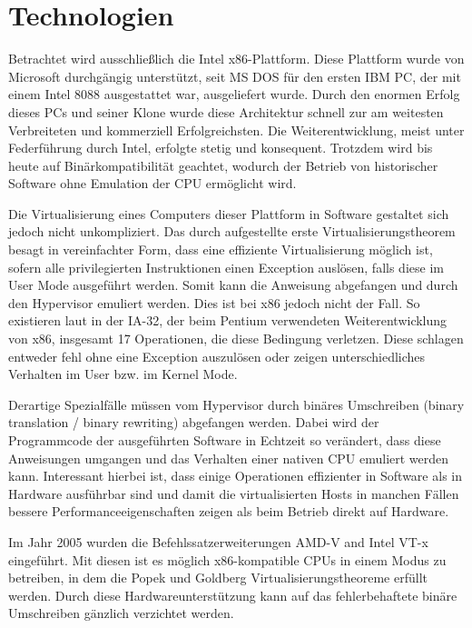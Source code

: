 \section{Technologien}
\label{sec:technologies}


		Betrachtet wird ausschließlich die Intel x86-Plattform.
		Diese Plattform wurde von Microsoft durchgängig unterstützt, seit MS DOS für den ersten IBM PC, der mit einem Intel 8088 ausgestattet war, ausgeliefert wurde.
		Durch den enormen Erfolg dieses PCs und seiner Klone wurde diese Architektur schnell zur am weitesten Verbreiteten und kommerziell Erfolgreichsten.
		Die Weiterentwicklung, meist unter Federführung durch Intel, erfolgte stetig und konsequent. 
		Trotzdem wird bis heute auf Binärkompatibilität geachtet, wodurch der Betrieb von historischer Software ohne Emulation der CPU ermöglicht wird. 
		
		Die Virtualisierung eines Computers dieser Plattform in Software gestaltet sich jedoch nicht unkompliziert.
		Das durch \cite{PopekGoldberg} aufgestellte erste Virtualisierungstheorem besagt in vereinfachter Form, dass eine effiziente Virtualisierung möglich ist, sofern alle privilegierten Instruktionen einen Exception auslösen, falls diese im User Mode ausgeführt werden.
		Somit kann die Anweisung abgefangen und durch den Hypervisor emuliert werden. 
		Dies ist bei x86 jedoch nicht der Fall.
		So existieren laut \cite{PentiumVirt} in der IA-32, der beim Pentium verwendeten Weiterentwicklung von x86, insgesamt 17 Operationen, die diese Bedingung verletzen.
		Diese schlagen entweder fehl ohne eine Exception auszulösen oder zeigen unterschiedliches Verhalten im User bzw. im Kernel Mode.

		Derartige Spezialfälle müssen vom Hypervisor durch binäres Umschreiben (binary translation / binary rewriting) abgefangen werden. 
		Dabei wird der Programmcode der ausgeführten Software in Echtzeit so verändert, dass diese Anweisungen umgangen und das Verhalten einer nativen CPU emuliert werden kann. 
		Interessant hierbei ist, dass einige Operationen effizienter in Software als in Hardware ausführbar sind und damit die virtualisierten Hosts in manchen Fällen bessere Performanceeigenschaften zeigen als beim Betrieb direkt auf Hardware.

		Im Jahr 2005 wurden die Befehlssatzerweiterungen AMD-V and Intel VT-x eingeführt.
		Mit diesen ist es möglich x86-kompatible CPUs in einem Modus zu betreiben, in dem die Popek und Goldberg Virtualisierungstheoreme erfüllt werden. 
		Durch diese Hardwareunterstützung kann auf das fehlerbehaftete binäre Umschreiben gänzlich verzichtet werden.

